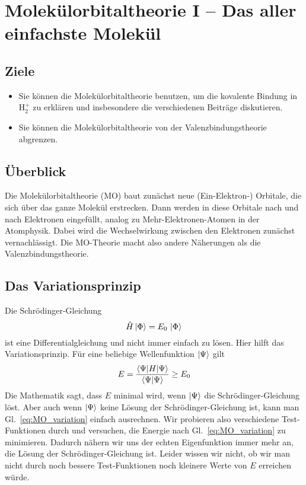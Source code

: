 
\chapter{Molekülorbitaltheorie I -- Das aller einfachste Molekül}




\section{Ziele}

\begin{itemize}
\item Sie können die Molekülorbitaltheorie benutzen, um die kovalente Bindung in H$_2^+$ zu erklären und insbesondere die verschiedenen Beiträge  diskutieren.

\item Sie können die Molekülorbitaltheorie von der Valenzbindungstheorie abgrenzen.


\end{itemize}

\section{Überblick}

Die Molekülorbitaltheorie  (MO) baut zunächst neue (Ein-Elektron-) Orbitale, die sich über das ganze Molekül erstrecken. Dann werden in diese Orbitale nach und nach Elektronen eingefüllt, analog zu Mehr-Elektronen-Atomen in der Atomphysik. Dabei wird die Wechselwirkung zwischen den Elektronen zunächst vernachlässigt. Die MO-Theorie macht also andere Näherungen als die Valenzbindungstheorie.

 
 
\section{Das Variationsprinzip}

 
Die Schrödinger-Gleichung
\begin{equation}
 \hat{H} \ket{\Phi} = E_0 \, \ket{\Phi} 
\end{equation}
ist eine Differentialgleichung und nicht immer einfach zu lösen. Hier hilft das Variationsprinzip. Für eine beliebige Wellenfunktion  $\ket{\Psi}$ gilt
\begin{equation}
 E = \frac{\braket{\Psi | H | \Psi}} {\braket{\Psi | \Psi}} \ge E_0
 \label{eq:MO_variation}
\end{equation}
Die Mathematik sagt, dass $E$ minimal wird, wenn  $\ket{\Psi}$ die Schrödinger-Gleichung löst. Aber auch wenn $\ket{\Psi}$ keine Lösung der Schrödinger-Gleichung  ist, kann man Gl.~\ref{eq:MO_variation} einfach ausrechnen. Wir probieren  also verschiedene Test-Funktionen durch und versuchen, die Energie nach Gl.~\ref{eq:MO_variation} zu minimieren. Dadurch nähern wir uns der echten Eigenfunktion immer mehr an, die Lösung der Schrödinger-Gleichung ist. Leider wissen wir nicht, ob wir man nicht durch noch bessere Test-Funktionen noch kleinere Werte von $E$ erreichen würde.

